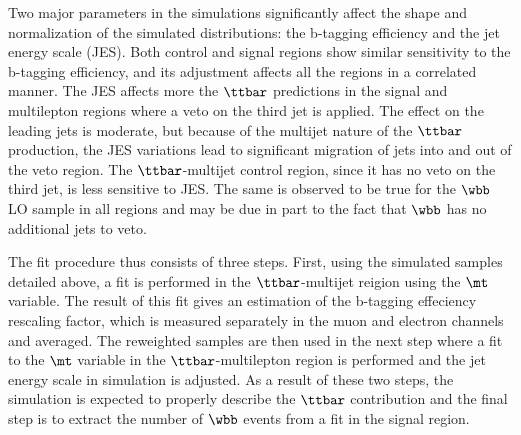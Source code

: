 
%

Two major parameters in the simulations
 significantly affect the shape and
 normalization of the simulated distributions:
 the b-tagging efficiency and the jet energy scale (JES).
Both control and signal regions show similar
 sensitivity to the b-tagging efficiency,
 and its adjustment affects all the regions
 in a correlated manner.
The JES affects more the $\ttbar$ predictions
 in the signal and multilepton regions where a veto
 on the third jet is applied.
The effect on the leading jets is moderate,
 but because of the multijet nature of the $\ttbar$ production,
 the JES variations lead to significant migration of jets
 into and out of the veto region.
The $\ttbar$-multijet control region,
 since it has no veto on the third jet,
 is less sensitive to JES.
The same is observed to be true for the $\wbb$ LO sample
 in all regions and may be due in part to the fact that
 $\wbb$ has no additional jets to veto.

The fit procedure thus consists of three steps.
First, using the simulated samples detailed above,
 a fit is performed in the $\ttbar$-multijet reigion
 using the $\mt$ variable.
The result of this fit gives an estimation of the
 b-tagging effeciency rescaling factor, which
 is measured separately in the muon and electron
 channels and averaged. %
The reweighted samples are then used in the next step
 where a fit to the $\mt$ variable in the
 $\ttbar$-multilepton region is performed and
 the jet energy scale in simulation is adjusted.
As a result of these two steps, the simulation is
 expected to properly describe the $\ttbar$ contribution
 and the final step is to extract the number of
 $\wbb$ events from a fit in the signal region.

